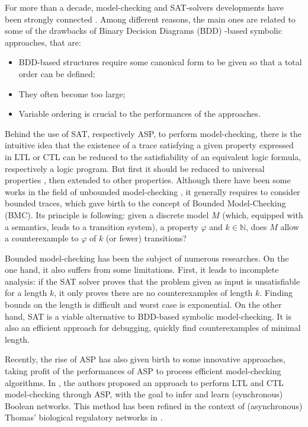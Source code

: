 For more than a decade, model-checking and SAT-solvers developments have been strongly connected \cite{biere1999symbolic}. Among different reasons, the main ones are related to some of the drawbacks of Binary Decision Diagrams (BDD) -based symbolic approaches, that are:
\begin{itemize}
\item BDD-based structures require some canonical form to be given so that a total order can be defined; 
\item They often become too large;
\item Variable ordering is crucial to the performances of the approaches.  
\end{itemize}

Behind the use of SAT, respectively ASP, to perform model-checking, there is the intuitive idea that the existence of a trace satisfying a given property expressed in LTL \cite{biere1999symbolic} or CTL can be reduced to the satisfiability of an equivalent logic formula, respectively a logic program. But first it should be reduced to universal properties \cite{penczek2002bounded}, then extended to other properties. Although there have been some works in the field of unbounded model-checking \cite{mcmillan2002applying}, it generally requires to consider bounded traces, which gave birth to the concept of Bounded Model-Checking (BMC). Its principle is following: given a discrete model $M$ (which, equipped with a semantics, leads to a transition system), a property $\varphi$ and $k \in \mathbb{N}$, does $M$ allow a counterexample to $\varphi$ of $k$ (or fewer) transitions? 

Bounded model-checking has been the subject of numerous researches. On the one hand, it also suffers from some limitations. First, it leads to incomplete analysis: if the SAT solver proves that the problem given as input is unsatisfiable for a length $k$, it only proves there are no counterexamples of length $k$. Finding bounds on the length is difficult and worst case is exponential. On the other hand, SAT is a viable alternative to BDD-based symbolic model-checking. It is also an efficient approach for debugging, \ie quickly find counterexamples of minimal length. 

Recently, the rise of ASP has also given birth to some innovative approaches, taking profit of the performances of ASP to process efficient model-checking algorithms. In \cite{rocca2013inference}, the authors proposed an approach to perform LTL and CTL model-checking through ASP, with the goal to infer and learn (synchronous) Boolean networks. This method has been refined in the context of (asynchronous) Thomas' biological regulatory networks in \cite{roccaasp}. 

